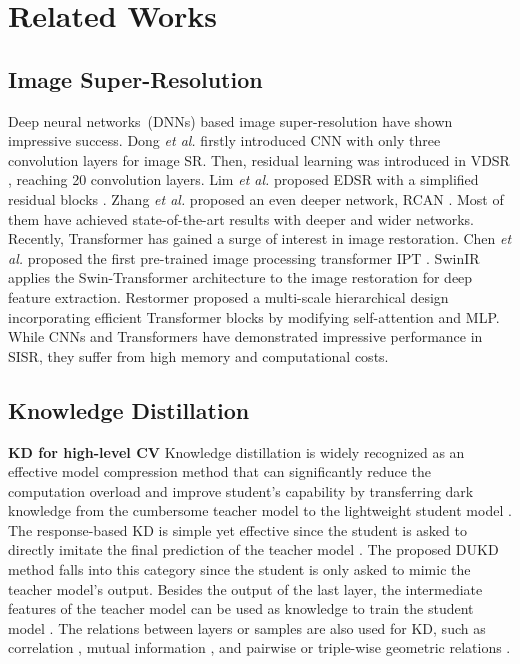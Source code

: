 \documentclass[10pt,twocolumn,letterpaper]{article}
\begin{document}
 \section{Related Works}\label{sec: related}
\subsection{Image Super-Resolution}
Deep neural networks~(DNNs) based image super-resolution have shown impressive success. Dong \textit{et al.} \cite{dong2014learning} firstly introduced CNN with only three convolution layers for image SR. Then, residual learning was introduced in VDSR \cite{kim2016accurate}, reaching 20 convolution layers. Lim \textit{et al.} proposed EDSR \cite{lim2017enhanced} with a simplified residual blocks \cite{ResNet}. Zhang \textit{et al.} proposed an even deeper network, RCAN \cite{zhang2018image}. Most of them have achieved state-of-the-art results with deeper and wider networks. 
Recently, Transformer has gained a surge of interest in image restoration. Chen \textit{et al.} proposed the first pre-trained image processing transformer IPT \cite{chen2021pre}. 
SwinIR \cite{liang2021swinir} applies the Swin-Transformer architecture to the image restoration for deep feature extraction.
Restormer \cite{zamir2022restormer} proposed a multi-scale hierarchical design incorporating efficient Transformer blocks by modifying self-attention and MLP. 
While CNNs and Transformers have demonstrated impressive performance in SISR, they suffer from high memory and computational costs.

\subsection{Knowledge Distillation}
\textbf{KD for high-level CV}
Knowledge distillation is widely recognized as an effective model compression method that can significantly reduce the computation overload and improve student's capability by transferring dark knowledge from the cumbersome teacher model to the lightweight student model \cite{hinton2015distilling, yim2017gift, gou2021knowledge}. The response-based KD is simple yet effective since the student is asked to directly imitate the final prediction of the teacher model \cite{hinton2015distilling,zhao2022decoupled,chen2017learning}.
The proposed DUKD method falls into this category since the student is only asked to mimic the teacher model's output.
Besides the output of the last layer, the intermediate features of the teacher model can be used as knowledge to train the student model \cite{romero2014fitnets, zagoruyko2016paying,kim2018paraphrasing,passban2021alp,guo2021distilling}. The relations between layers or samples are also used for KD, such as correlation \cite{yim2017gift,you2017learning}, mutual information \cite{passalis2020heterogeneous}, and pairwise or triple-wise geometric relations \cite{park2019relational}.
\end{document}
